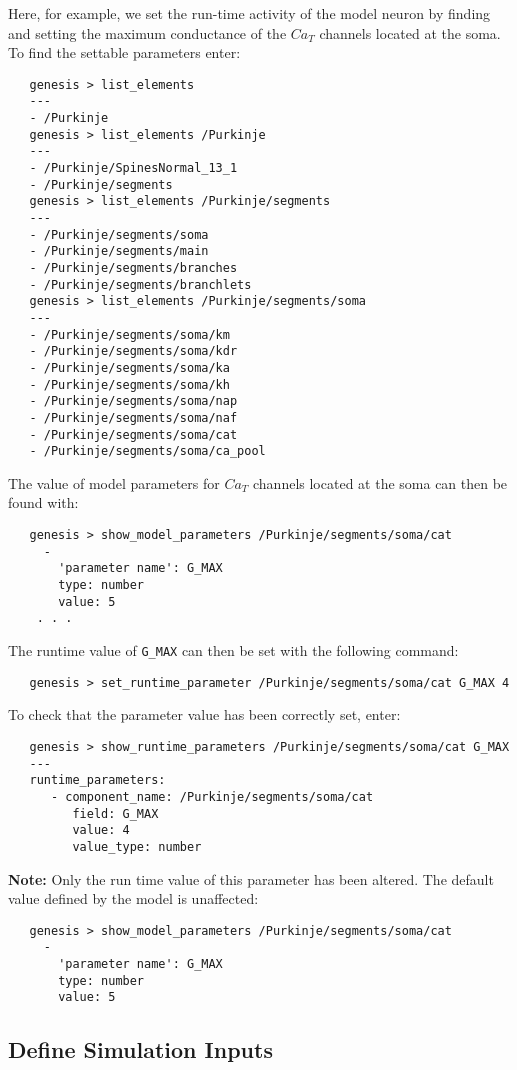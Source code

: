 \documentclass[12pt]{article}
\begin{document}
Here, for example, we set the run-time activity of the model neuron by finding and
setting the maximum conductance of the $Ca_T$ channels located at the soma. To find the settable parameters enter:
\begin{verbatim}
   genesis > list_elements
   ---
   - /Purkinje
   genesis > list_elements /Purkinje
   ---
   - /Purkinje/SpinesNormal_13_1
   - /Purkinje/segments
   genesis > list_elements /Purkinje/segments
   ---
   - /Purkinje/segments/soma
   - /Purkinje/segments/main
   - /Purkinje/segments/branches
   - /Purkinje/segments/branchlets
   genesis > list_elements /Purkinje/segments/soma
   ---
   - /Purkinje/segments/soma/km
   - /Purkinje/segments/soma/kdr
   - /Purkinje/segments/soma/ka
   - /Purkinje/segments/soma/kh
   - /Purkinje/segments/soma/nap
   - /Purkinje/segments/soma/naf
   - /Purkinje/segments/soma/cat
   - /Purkinje/segments/soma/ca_pool
\end{verbatim}
The value of model parameters for $Ca_T$ channels located at the soma can then be found with:
\begin{verbatim}
   genesis > show_model_parameters /Purkinje/segments/soma/cat
     -
       'parameter name': G_MAX
       type: number
       value: 5
    . . .  
\end{verbatim}
The runtime value of {\tt G\_MAX} can then be set with the following command:
\begin{verbatim}
   genesis > set_runtime_parameter /Purkinje/segments/soma/cat G_MAX 4
\end{verbatim}
To check that the parameter value has been correctly set, enter:
\begin{verbatim}
   genesis > show_runtime_parameters /Purkinje/segments/soma/cat G_MAX
   ---
   runtime_parameters:
      - component_name: /Purkinje/segments/soma/cat
         field: G_MAX
         value: 4
         value_type: number
\end{verbatim}
{\bf Note:} Only the run time value of this parameter has been altered. The default value defined by the model is unaffected:
\begin{verbatim}
   genesis > show_model_parameters /Purkinje/segments/soma/cat
     -
       'parameter name': G_MAX
       type: number
       value: 5
\end{verbatim}

\subsection*{Define Simulation Inputs}
\end{document}
